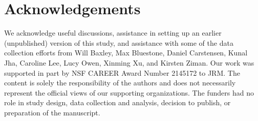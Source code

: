 \documentclass[10pt]{article}
\begin{document}
\section*{Acknowledgements}

We acknowledge useful discussions, assistance in setting up an earlier
(unpublished) version of this study, and assistance with some of the data
collection efforts from Will Baxley, Max Bluestone, Daniel Carstensen, Kunal
Jha, Caroline Lee, Lucy Owen, Xinming Xu, and Kirsten Ziman. Our work was
supported in part by NSF CAREER Award Number 2145172 to JRM. The content is
solely the responsibility of the authors and does not necessarily represent the
official views of our supporting organizations. The funders had no role in
study design, data collection and analysis, decision to publish, or preparation
of the manuscript.





\end{document}
